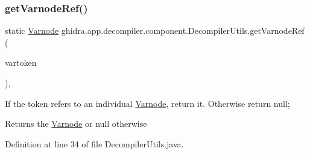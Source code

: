 \subsubsection{\texorpdfstring{getVarnodeRef()}{getVarnodeRef()}}
{\footnotesize\ttfamily static \mbox{\hyperlink{class_varnode}{Varnode}} ghidra.\+app.\+decompiler.\+component.\+Decompiler\+Utils.\+get\+Varnode\+Ref (\begin{DoxyParamCaption}\item[{\mbox{\hyperlink{classghidra_1_1app_1_1decompiler_1_1_clang_token}{Clang\+Token}}}]{vartoken }\end{DoxyParamCaption})\hspace{0.3cm}{\ttfamily [inline]}, {\ttfamily [static]}}

If the token refers to an individual \mbox{\hyperlink{class_varnode}{Varnode}}, return it. Otherwise return null; \begin{DoxyReturn}{Returns}
the \mbox{\hyperlink{class_varnode}{Varnode}} or null otherwise 
\end{DoxyReturn}


Definition at line 34 of file Decompiler\+Utils.\+java.

